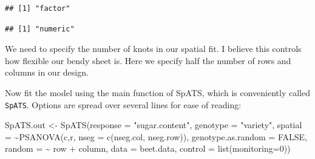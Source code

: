 \documentclass[
]{book}
\newenvironment{Shaded}{\begin{snugshade}}{\end{snugshade}}
\newcommand{\AttributeTok}[1]{\textcolor[rgb]{0.77,0.63,0.00}{#1}}
\newcommand{\CommentTok}[1]{\textcolor[rgb]{0.56,0.35,0.01}{\textit{#1}}}
\newcommand{\ConstantTok}[1]{\textcolor[rgb]{0.00,0.00,0.00}{#1}}
\newcommand{\DecValTok}[1]{\textcolor[rgb]{0.00,0.00,0.81}{#1}}
\newcommand{\FunctionTok}[1]{\textcolor[rgb]{0.00,0.00,0.00}{#1}}
\newcommand{\NormalTok}[1]{#1}
\newcommand{\OtherTok}[1]{\textcolor[rgb]{0.56,0.35,0.01}{#1}}
\newcommand{\SpecialCharTok}[1]{\textcolor[rgb]{0.00,0.00,0.00}{#1}}
\newcommand{\StringTok}[1]{\textcolor[rgb]{0.31,0.60,0.02}{#1}}
\begin{document}
\begin{Shaded}
\end{Shaded}

\begin{verbatim}
## [1] "factor"
\end{verbatim}

\begin{Shaded}
\end{Shaded}

\begin{verbatim}
## [1] "numeric"
\end{verbatim}

We need to specify the number of knots in our spatial fit. I believe this controls how flexible our bendy sheet is. Here we specify half the number of rows and columns in our design.

\begin{Shaded}
\end{Shaded}

Now fit the model using the main function of SpATS, which is conveniently called \texttt{SpATS}. Options are spread over several lines for ease of reading:

\begin{Shaded}
\begin{Highlighting}[]
\NormalTok{SpATS.out }\OtherTok{\textless{}{-}} \FunctionTok{SpATS}\NormalTok{(}\AttributeTok{response =} \StringTok{"sugar.content"}\NormalTok{,}
    \AttributeTok{genotype =} \StringTok{"variety"}\NormalTok{,}
    \AttributeTok{spatial =} \SpecialCharTok{\textasciitilde{}}\FunctionTok{PSANOVA}\NormalTok{(c,r, }\AttributeTok{nseg =} \FunctionTok{c}\NormalTok{(nseg.col, nseg.row)),}
    \AttributeTok{genotype.as.random =} \ConstantTok{FALSE}\NormalTok{,}
    \AttributeTok{random =} \SpecialCharTok{\textasciitilde{}}\NormalTok{ row }\SpecialCharTok{+}\NormalTok{ column,}
    \AttributeTok{data =}\NormalTok{ beet.data,}
    \AttributeTok{control =} \FunctionTok{list}\NormalTok{(}\AttributeTok{monitoring=}\DecValTok{0}\NormalTok{))}
\end{Highlighting}
\end{Shaded}
\end{document}
